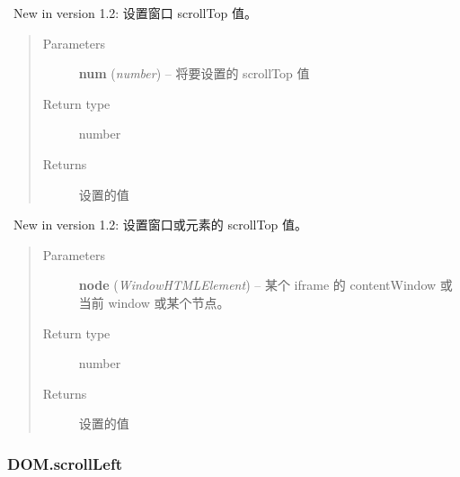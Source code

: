 \documentclass[letterpaper,10pt,english]{sphinxmanual}
\begin{document}

\begin{fulllineitems}
~New in version 1.2: 设置窗口 scrollTop 值。\begin{quote}\begin{description}
\item[{Parameters}] \leavevmode
\textbf{num} (\emph{number}) -- 将要设置的 scrollTop 值

\item[{Return type}] \leavevmode
number

\item[{Returns}] \leavevmode
设置的值

\end{description}\end{quote}

\end{fulllineitems}



\begin{fulllineitems}
~New in version 1.2: 设置窗口或元素的 scrollTop 值。\begin{quote}\begin{description}
\item[{Parameters}] \leavevmode
\textbf{node} (\emph{Window\textbar{}HTMLElement}) -- 某个 iframe 的 contentWindow 或当前 window 或某个节点。

\item[{Return type}] \leavevmode
number

\item[{Returns}] \leavevmode
设置的值

\end{description}\end{quote}

\end{fulllineitems}



\subsubsection{DOM.scrollLeft}
\label{api/core/dom/scrollLeft:dom-scrollleft}\label{api/core/dom/scrollLeft::doc}
\end{document}
